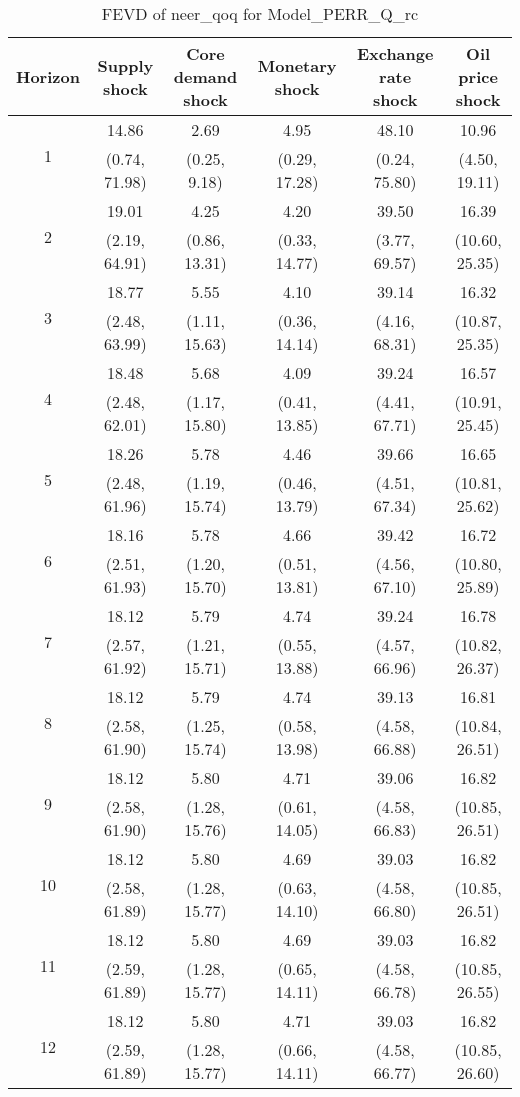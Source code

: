 \documentclass{article}
\begin{document}
\begin{table}
	\footnotesize
	\caption{FEVD of neer_qoq for Model_PERR_Q_rc}
	\begin{tabular}{cccccc}
		Horizon & Supply shock & Core demand shock & Monetary shock & Exchange rate shock & Oil price shock\\ \hline
		\multirow{2}{*}{1} & 14.86 & 2.69 & 4.95 & 48.10 & 10.96\\
		 & (0.74, 71.98) & (0.25, 9.18) & (0.29, 17.28) & (0.24, 75.80) & (4.50, 19.11)\\
		\multirow{2}{*}{2} & 19.01 & 4.25 & 4.20 & 39.50 & 16.39\\
		 & (2.19, 64.91) & (0.86, 13.31) & (0.33, 14.77) & (3.77, 69.57) & (10.60, 25.35)\\
		\multirow{2}{*}{3} & 18.77 & 5.55 & 4.10 & 39.14 & 16.32\\
		 & (2.48, 63.99) & (1.11, 15.63) & (0.36, 14.14) & (4.16, 68.31) & (10.87, 25.35)\\
		\multirow{2}{*}{4} & 18.48 & 5.68 & 4.09 & 39.24 & 16.57\\
		 & (2.48, 62.01) & (1.17, 15.80) & (0.41, 13.85) & (4.41, 67.71) & (10.91, 25.45)\\
		\multirow{2}{*}{5} & 18.26 & 5.78 & 4.46 & 39.66 & 16.65\\
		 & (2.48, 61.96) & (1.19, 15.74) & (0.46, 13.79) & (4.51, 67.34) & (10.81, 25.62)\\
		\multirow{2}{*}{6} & 18.16 & 5.78 & 4.66 & 39.42 & 16.72\\
		 & (2.51, 61.93) & (1.20, 15.70) & (0.51, 13.81) & (4.56, 67.10) & (10.80, 25.89)\\
		\multirow{2}{*}{7} & 18.12 & 5.79 & 4.74 & 39.24 & 16.78\\
		 & (2.57, 61.92) & (1.21, 15.71) & (0.55, 13.88) & (4.57, 66.96) & (10.82, 26.37)\\
		\multirow{2}{*}{8} & 18.12 & 5.79 & 4.74 & 39.13 & 16.81\\
		 & (2.58, 61.90) & (1.25, 15.74) & (0.58, 13.98) & (4.58, 66.88) & (10.84, 26.51)\\
		\multirow{2}{*}{9} & 18.12 & 5.80 & 4.71 & 39.06 & 16.82\\
		 & (2.58, 61.90) & (1.28, 15.76) & (0.61, 14.05) & (4.58, 66.83) & (10.85, 26.51)\\
		\multirow{2}{*}{10} & 18.12 & 5.80 & 4.69 & 39.03 & 16.82\\
		 & (2.58, 61.89) & (1.28, 15.77) & (0.63, 14.10) & (4.58, 66.80) & (10.85, 26.51)\\
		\multirow{2}{*}{11} & 18.12 & 5.80 & 4.69 & 39.03 & 16.82\\
		 & (2.59, 61.89) & (1.28, 15.77) & (0.65, 14.11) & (4.58, 66.78) & (10.85, 26.55)\\
		\multirow{2}{*}{12} & 18.12 & 5.80 & 4.71 & 39.03 & 16.82\\
		 & (2.59, 61.89) & (1.28, 15.77) & (0.66, 14.11) & (4.58, 66.77) & (10.85, 26.60)\\
	\end{tabular}
\label{tab:fevd-Model_PERR_Q_rc-neer_qoq}
\end{table}
\end{document}
